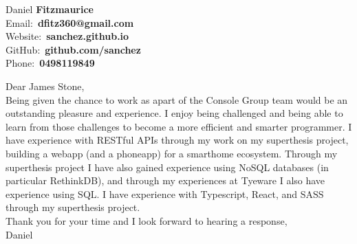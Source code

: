 \documentclass[a4paper]{article}
\newcommand{\primary}{\color{orange}}
\newcommand{\black}{\color{black}}
\begin{document}
	\begin{minipage}{\linewidth}
		\raggedleft\Huge{ Daniel \primary\textbf{Fitzmaurice}}\\
		\black\large Email:\ \primary\textbf{dfitz360@gmail.com}\\
		\black\large Website:\ \primary\textbf{sanchez.github.io}\\
		\black\large GitHub:\ \primary\textbf{github.com/sanchez}\\
		\black\large Phone:\ \primary\textbf{0498119849}
		\black\vspace{0em}
	\end{minipage}
	\pagestyle{fancy}\fancyhf{}
	\lhead{}\chead{}\rhead{}
	\lfoot{Daniel \primary\textbf{Fitzmaurice}}\cfoot{}
	
	
	Dear James Stone,\\
	
	Being given the chance to work as apart of the Console Group team would be an outstanding pleasure and experience. I enjoy being challenged and being able to learn from those challenges to become a more efficient and smarter programmer. I have experience with RESTful APIs through my work on my superthesis project, building a webapp (and a phoneapp) for a smarthome ecosystem. Through my superthesis project I have also gained experience using NoSQL databases (in particular RethinkDB), and through my experiences at Tyeware I also have experience using SQL. I have experience with Typescript, React, and SASS through my superthesis project.\\
	
	Thank you for your time and I look forward to hearing a response,\\
	Daniel
	
	
\end{document}
